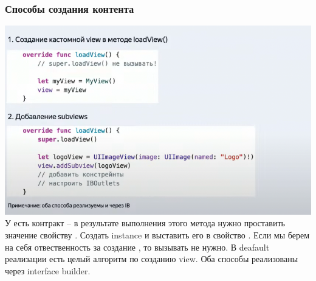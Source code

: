 \documentclass{article}
\begin{document}
        \subsubsection{Способы создания контента}
        \includegraphics[scale = 0.5]{pic/Снимок экрана 2023-08-02 в 20.55.35.png}
        \newline
        У  есть контракт -- в результате выполнения этого метода нужно проставить значение свойству . Создать instance и выставить его в свойство . 
        \newline
        Если мы берем на себя отвественность за создание , то вызывать  не нужно. В deafault реализации  есть целый алгоритм по созданию view.
        \newline   
        Оба способы реализованы через interface builder.
\end{document}
